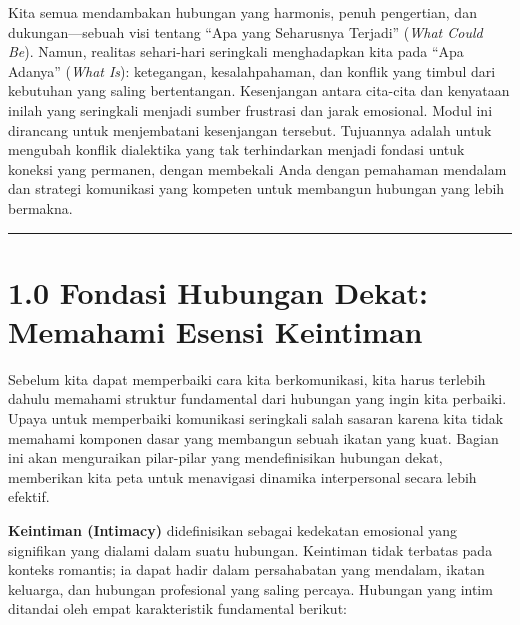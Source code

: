 \documentclass[
  letterpaper,
  DIV=11,
  numbers=noendperiod]{scrreprt}
\begin{document}
Kita semua mendambakan hubungan yang harmonis, penuh pengertian, dan
dukungan---sebuah visi tentang ``Apa yang Seharusnya Terjadi''
(\emph{What Could Be}). Namun, realitas sehari-hari seringkali
menghadapkan kita pada ``Apa Adanya'' (\emph{What Is}): ketegangan,
kesalahpahaman, dan konflik yang timbul dari kebutuhan yang saling
bertentangan. Kesenjangan antara cita-cita dan kenyataan inilah yang
seringkali menjadi sumber frustrasi dan jarak emosional. Modul ini
dirancang untuk menjembatani kesenjangan tersebut. Tujuannya adalah
untuk mengubah konflik dialektika yang tak terhindarkan menjadi fondasi
untuk koneksi yang permanen, dengan membekali Anda dengan pemahaman
mendalam dan strategi komunikasi yang kompeten untuk membangun hubungan
yang lebih bermakna.

\begin{center}\rule{0.5\linewidth}{0.5pt}\end{center}

\section{\texorpdfstring{\textbf{1.0 Fondasi Hubungan Dekat: Memahami
Esensi
Keintiman}}{1.0 Fondasi Hubungan Dekat: Memahami Esensi Keintiman}}\label{fondasi-hubungan-dekat-memahami-esensi-keintiman}

Sebelum kita dapat memperbaiki cara kita berkomunikasi, kita harus
terlebih dahulu memahami struktur fundamental dari hubungan yang ingin
kita perbaiki. Upaya untuk memperbaiki komunikasi seringkali salah
sasaran karena kita tidak memahami komponen dasar yang membangun sebuah
ikatan yang kuat. Bagian ini akan menguraikan pilar-pilar yang
mendefinisikan hubungan dekat, memberikan kita peta untuk menavigasi
dinamika interpersonal secara lebih efektif.

\textbf{Keintiman (Intimacy)} didefinisikan sebagai kedekatan emosional
yang signifikan yang dialami dalam suatu hubungan. Keintiman tidak
terbatas pada konteks romantis; ia dapat hadir dalam persahabatan yang
mendalam, ikatan keluarga, dan hubungan profesional yang saling percaya.
Hubungan yang intim ditandai oleh empat karakteristik fundamental
berikut:
\end{document}
